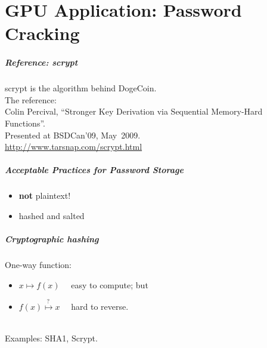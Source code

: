\part{GPU Application: Password Cracking}
\frame{\partpage}

\begin{frame}
  \frametitle{Reference: scrypt}

  
    scrypt is the algorithm behind DogeCoin. \\[1em] The reference:\\[1em]
    
    Colin Percival, ``Stronger Key Derivation via Sequential Memory-Hard Functions''. \\
    Presented at BSDCan'09, May~2009.\\[1em]

    \url{http://www.tarsnap.com/scrypt.html}
  
\end{frame}

\begin{frame}
  \frametitle{Acceptable Practices for Password Storage}
  
    \begin{itemize}
    \item {\Huge \alert{{\bf not} plaintext!}}
    \item \Large hashed and salted
    \end{itemize}
       

\end{frame}

\begin{frame}
  \frametitle{Cryptographic hashing}
  
    One-way function:
    \begin{itemize}
    \item $x \mapsto f(x)$ ~~easy to compute; but
      \item $f(x) \stackrel{?~}{\mapsto} x$ ~~hard to reverse.
    \end{itemize}~\\
    Examples: SHA1, Scrypt.

\end{frame}

